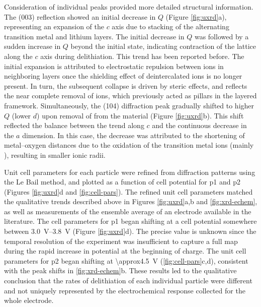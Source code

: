 \documentclass{article}
\begin{document}
Consideration of individual peaks provided more detailed structural
information. The (003) reflection showed an initial decrease in $Q$
(Figure \ref{fig:uxrd}a), representing an expansion of the $c$ axis
due to stacking of the alternating transition metal and lithium
layers\citeme{}. The initial decrease in $Q$ was followed by a sudden
increase in $Q$ beyond the initial state, indicating contraction of
the lattice along the $c$ axis during delithiation. This trend has
been reported before. The initial expansion is attributed to
electrostatic repulsion between  ions in neighboring layers
once the shielding effect of deintercalated  ions is no longer
present\cite{robert2015}. In turn, the subsequent collapse is driven
by steric effects, and reflects the near complete removal of 
ions, which previously acted as pillars in the layered
framework. Simultaneously, the (104) diffraction peak gradually
shifted to higher $Q$ (lower $d$) upon removal of  from the
material (Figure \ref{fig:uxrd}b). This shift reflected the balance
between the trend along $c$ and the continuous decrease in the $a$
dimension. In this case, the decrease was attributed to the shortening
of metal--oxygen distances due to the oxidation of the transition
metal ions (mainly ), resulting in smaller ionic radii.

Unit cell parameters for each particle were refined from diffraction
patterns using the Le Bail method, and plotted as a function of cell
potential for \gls{p1} and \gls{p2} (Figures \ref{fig:uxrd}d and
\ref{fig:cell-pars}). The refined unit cell parameters matched the
qualitative trends described above in Figures \ref{fig:uxrd}a,b and
\ref{fig:xrd-echem}, as well as measurements of the ensemble average
of an electrode available in the literature\cite{novak2015}. The
cell parameters for \gls{p1} began shifting at a cell potential
somewhere between \SIrange{3.0}{3.8}{\volt} (Figure
\ref{fig:uxrd}d). The precise value is unknown since the temporal
resolution of the experiment was insufficient to capture a full map
during the rapid increase in potential at the beginning of charge. The
unit cell parameters for \gls{p2} began shifting at
\SI{\approx4.5}{\volt} (\ref{fig:cell-pars}c,d), consistent with the
peak shifts in \ref{fig:xrd-echem}b. These results led to the
qualitative conclusion that the rates of delithiation of each
individual particle were different and not uniquely represented by the
electrochemical response collected for the whole electrode.

\end{document}
